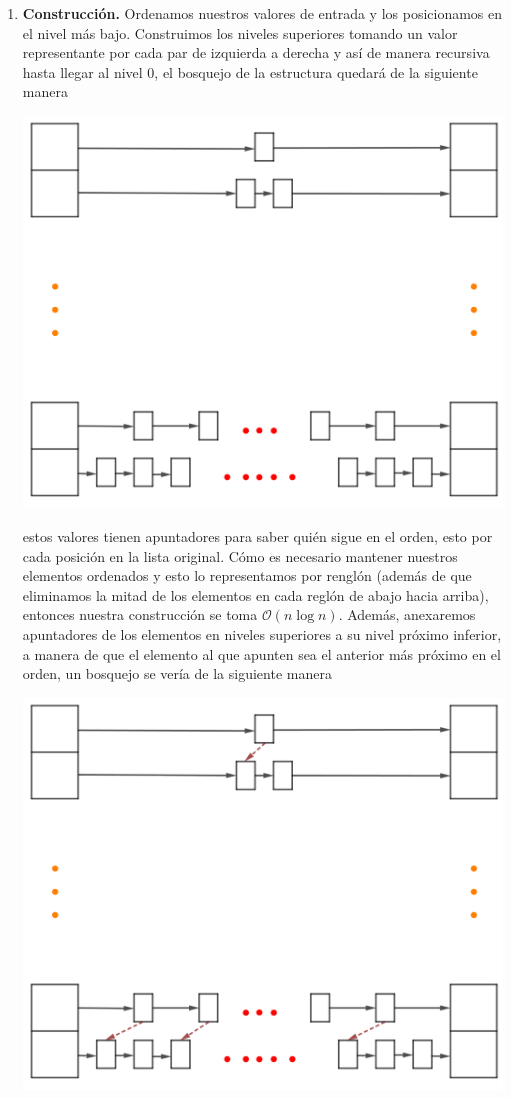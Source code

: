\begin{enumerate}
\item \textbf{Construcción.} Ordenamos nuestros valores de entrada y los posicionamos en el nivel más bajo.
  Construimos los niveles superiores tomando un valor representante por cada par de izquierda a derecha y así
  de manera recursiva hasta llegar al nivel 0, el bosquejo de la estructura quedará de la siguiente manera
  \begin{center}
    \includegraphics[scale=0.17]{./SL1.png}
  \end{center}
  estos valores tienen apuntadores para saber quién sigue en el orden, esto por cada posición en la lista original.
  Cómo es necesario mantener nuestros elementos ordenados y esto lo representamos por renglón (además de que eliminamos
  la mitad de los elementos en cada reglón de abajo hacia arriba), entonces nuestra construcción se toma
  $\mathcal{O}(n \log n)$. Además, anexaremos apuntadores de los elementos en niveles superiores a su nivel próximo inferior,
  a manera de que el elemento al que apunten sea el anterior más próximo en el orden, un bosquejo se vería de la
  siguiente manera
  \begin{center}
    \includegraphics[scale=0.17]{./SL2.png}

\end{center}
\end{enumerate}
